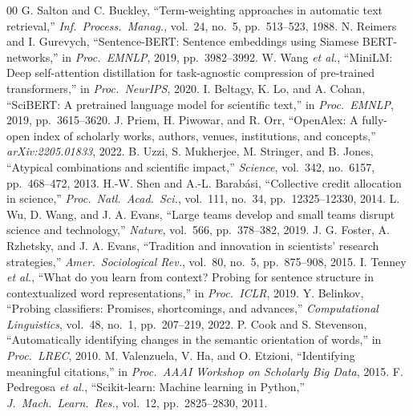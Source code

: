 \documentclass[conference]{IEEEtran}
\begin{document}
\begin{thebibliography}{00}
 G. Salton and C. Buckley, ``Term-weighting approaches in automatic text retrieval,'' \emph{Inf.\ Process.\ Manag.}, vol.~24, no.~5, pp.~513--523, 1988.
 N. Reimers and I. Gurevych, ``Sentence-BERT: Sentence embeddings using Siamese BERT-networks,'' in \emph{Proc.\ EMNLP}, 2019, pp.~3982--3992.
 W. Wang \emph{et al.}, ``MiniLM: Deep self-attention distillation for task-agnostic compression of pre-trained transformers,'' in \emph{Proc.\ NeurIPS}, 2020.
 I. Beltagy, K. Lo, and A. Cohan, ``SciBERT: A pretrained language model for scientific text,'' in \emph{Proc.\ EMNLP}, 2019, pp.~3615--3620.
 J. Priem, H. Piwowar, and R. Orr, ``OpenAlex: A fully-open index of scholarly works, authors, venues, institutions, and concepts,'' \emph{arXiv:2205.01833}, 2022.
 B. Uzzi, S. Mukherjee, M. Stringer, and B. Jones, ``Atypical combinations and scientific impact,'' \emph{Science}, vol.~342, no.~6157, pp.~468--472, 2013.
 H.-W. Shen and A.-L. Barab\'asi, ``Collective credit allocation in science,'' \emph{Proc.\ Natl.\ Acad.\ Sci.}, vol.~111, no.~34, pp.~12325--12330, 2014.
 L. Wu, D. Wang, and J. A. Evans, ``Large teams develop and small teams disrupt science and technology,'' \emph{Nature}, vol.~566, pp.~378--382, 2019.
 J. G. Foster, A. Rzhetsky, and J. A. Evans, ``Tradition and innovation in scientists' research strategies,'' \emph{Amer.\ Sociological Rev.}, vol.~80, no.~5, pp.~875--908, 2015.
 I. Tenney \emph{et al.}, ``What do you learn from context? Probing for sentence structure in contextualized word representations,'' in \emph{Proc.\ ICLR}, 2019.
 Y. Belinkov, ``Probing classifiers: Promises, shortcomings, and advances,'' \emph{Computational Linguistics}, vol.~48, no.~1, pp.~207--219, 2022.
 P. Cook and S. Stevenson, ``Automatically identifying changes in the semantic orientation of words,'' in \emph{Proc.\ LREC}, 2010.
 M. Valenzuela, V. Ha, and O. Etzioni, ``Identifying meaningful citations,'' in \emph{Proc.\ AAAI Workshop on Scholarly Big Data}, 2015.
 F. Pedregosa \emph{et al.}, ``Scikit-learn: Machine learning in Python,'' \emph{J.\ Mach.\ Learn.\ Res.}, vol.~12, pp.~2825--2830, 2011.
\end{thebibliography}
\end{document}
